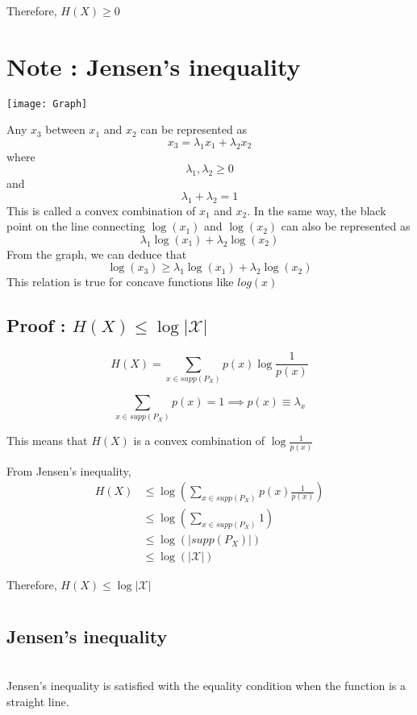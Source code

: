 \documentclass{article}
\begin{document}
Therefore, $H(X) \geq 0$

\section*{\large Note : Jensen's inequality} 
\graphicspath{ {./images/} }
\texttt{[image: Graph]}



Any $x_3$ between $x_1$ and $x_2$ can be represented as \[x_3 = \lambda_1x_1 + \lambda_2x_2\] where \[\lambda_1, \lambda_2 \geq 0\] and \[\lambda_1 + \lambda_2 = 1\]
This is called a convex combination of $x_1$ and $x_2$.\newline
In the same way, the black point on the line connecting $\log(x_1)$ and $\log(x_2)$ can also be represented as 
\[\lambda_1\log(x_1) + \lambda_2\log(x_2)\]
From the graph, we can deduce that \[\log(x_3) \geq \lambda_1\log(x_1) + \lambda_2\log(x_2)\]
This relation is true for concave functions like $log(x)$

\subsection*{Proof : $H(X) \leq \log|\mathcal{X}|$}

\begin{equation*}
H(X) = \sum_{x \in supp(P_X)}p(x) \log \frac {1}{p(x)} 
\end{equation*}

\[\sum_{x \in supp(P_X)}p(x) = 1 \implies p(x) \equiv \lambda_x\]

This means that $H(X)$ is a convex combination of $\log\frac{1}{p(x)}$ 

From Jensen's inequality,
\begin{equation*}
\begin{split}
H(X) &\leq \log(\sum_{x \in supp(P_X)}p(x)\frac {1}{p(x)}) \\
&\leq \log(\sum_{x \in supp(P_X)}1) \\
&\leq \log(|supp(P_X)|) \\
&\leq \log(|\mathcal{X}|)
\end{split}
\end{equation*}

Therefore, $H(X) \leq \log|\mathcal{X}|$
\newpage
\section{}
\subsection{Jensen's inequality}\\
Jensen's inequality is satisfied with the equality condition when the function is a straight line.
\end{document}
